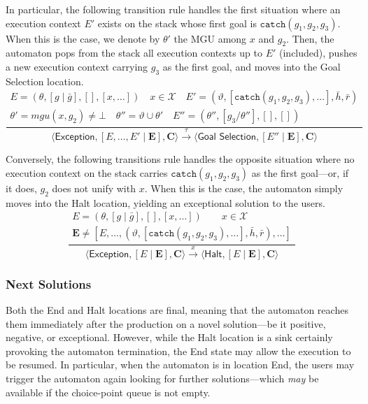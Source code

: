 \documentclass{article}
\newcommand{\stateStyle}[1]{\textsf{#1}}
\newcommand{\state}[1]{\stateStyle{#1}}
\newcommand{\stream}[1]{\bar{#1}}
\newcommand{\vect}[1]{\mathbf{#1}}
\newcommand{\notableset}[1]{\mathcal{#1}}
\newcommand{\f}[1]{\mathit{#1}}
\newcommand{\fx}[2]{\f{#1}(#2)}
\newcommand{\transition}[1]{\xrightarrow{\ #1\ }}
\begin{document}
In particular, the following transition rule handles the first situation where an execution context $E'$ exists on the stack whose first goal is $\mathtt{catch}(g_1, g_2, g_3)$.
%
When this is the case, we denote by $\theta'$ the MGU among $x$ and $g_2$.
%
Then, the automaton pops from the stack all execution contexts up to $E'$ (included), pushes a new execution context carrying $g_3$ as the first goal, and moves into the \state{Goal Selection} location.
%
\[
    \frac{
        \begin{array}{c}
            E = (\theta, [g \mid \stream{g}], [], [x, \ldots])
            \quad
            x \in \notableset{X}
            \quad
            E' = (\vartheta, [\mathtt{catch}(g_1, g_2, g_3), \ldots], \stream{h}, \stream{r})
            \\
            \theta' = \fx{mgu}{x, g_2} \neq \bot
            \quad
            \theta'' = \vartheta \cup \theta'
            \quad
            E'' = (\theta'', [g_3 / \theta''], [], [])
        \end{array}
    }{
        \langle \state{Exception}, [E, \ldots, E' \mid \vect{E}], \vect{C} \rangle
        \transition{\tau}
        \langle \state{Goal Selection}, [E'' \mid \vect{E}], \vect{C} \rangle
    }
\]

Conversely, the following transitions rule handles the opposite situation where no execution context on the stack carries $\mathtt{catch}(g_1, g_2, g_3)$ as the first goal---or, if it does, $g_2$ does not unify with $x$.
%
When this is the case, the automaton simply moves into the \state{Halt} location, yielding an exceptional solution to the users.
%
\[
    \frac{
        \begin{array}{c}
            E = (\theta, [g \mid \stream{g}], [], [x, \ldots])
            \qquad
            x \in \notableset{X}
            \\
            \vect{E} \neq [E, \ldots, (\vartheta, [\mathtt{catch}(g_1, g_2, g_3), \ldots], \stream{h}, \stream{r}), \ldots]
        \end{array}
    }{
        \langle \state{Exception}, [E \mid \vect{E}], \vect{C} \rangle
        \transition{x}
        \langle \state{Halt}, [E \mid \vect{E}], \vect{C} \rangle
    }
\]

\subsubsection{Next Solutions}

Both the \state{End} and \state{Halt} locations are final, meaning that the automaton reaches them immediately after the production on a novel solution---be it positive, negative, or exceptional.
%
However, while the \state{Halt} location is a sink certainly provoking the automaton termination, the \state{End} state may allow the execution to be resumed.
%
In particular, when the automaton is in location \state{End}, the users may trigger the automaton again looking for further solutions---which \emph{may} be available if the choice-point queue is not empty.
\end{document}
